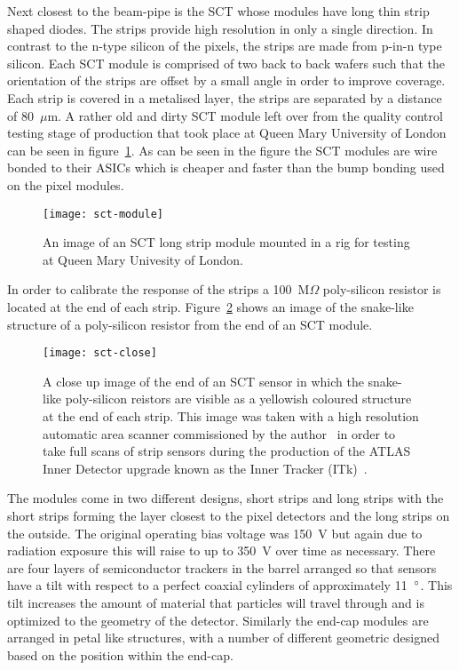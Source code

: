 Next closest to the beam-pipe is the SCT whose modules have long thin strip
shaped diodes. The strips provide high resolution in only a single direction. In
contrast to the n-type silicon of the pixels, the strips are made from p-in-n
type silicon. Each SCT module is comprised of two back to back wafers such that
the orientation of the strips are offset by a small angle in order to improve
coverage. Each strip is covered in a metalised layer, the strips are separated
by a distance of 80~$\mu$m. A rather old and dirty SCT module left over from the
quality control testing stage of production that took place at Queen Mary
University of London can be seen in figure~\ref{fig:strip-module}. As can be
seen in the figure the SCT modules are wire bonded to their ASICs which is
cheaper and faster than the bump bonding used on the pixel modules.
\begin{figure}[ht]
  \centering
  \texttt{[image: sct-module]}
  \caption[ATLAS long strip module]{An image of an SCT long strip module
    mounted in a rig for testing at Queen Mary Univesity of London.}
  \label{fig:strip-module}
\end{figure}
In order to calibrate the response of the strips a 100~M$\Omega$ poly-silicon
resistor is located at the end of each strip. Figure~\ref{fig:sct-close} shows an
image of the snake-like structure of a poly-silicon resistor from the end of an
SCT module.
\begin{figure}[ht]
  \centering
  \texttt{[image: sct-close]}
  \caption[ATLAS strip close-up]{A close up image of the end of an SCT sensor in
    which the snake-like poly-silicon reistors are visible as a yellowish
    coloured structure at the end of each strip. This image was taken with a
    high resolution automatic area scanner commissioned by the
    author~\cite{itk-scanner} in order to take full scans of strip sensors
    during the production of the ATLAS Inner Detector upgrade known as the Inner
    Tracker (ITk)~\cite{itk-tdr, itk-strips-tdr}.}
  \label{fig:sct-close}
\end{figure}
The modules come in two different designs, short strips and long
strips with the short strips forming the layer closest to the pixel detectors
and the long strips on the outside. The original operating bias voltage was
150~V but again due to radiation exposure this will raise to up to 350~V over
time as necessary. There are four layers of semiconductor trackers in the barrel
arranged so that sensors have a tilt with respect to a perfect coaxial cylinders
of approximately 11~$\degree$. This tilt increases the amount of material that
particles will travel through and is optimized to the geometry of the detector.
Similarly the end-cap modules are arranged in petal like structures, with a
number of different geometric designed based on the position within the end-cap.

